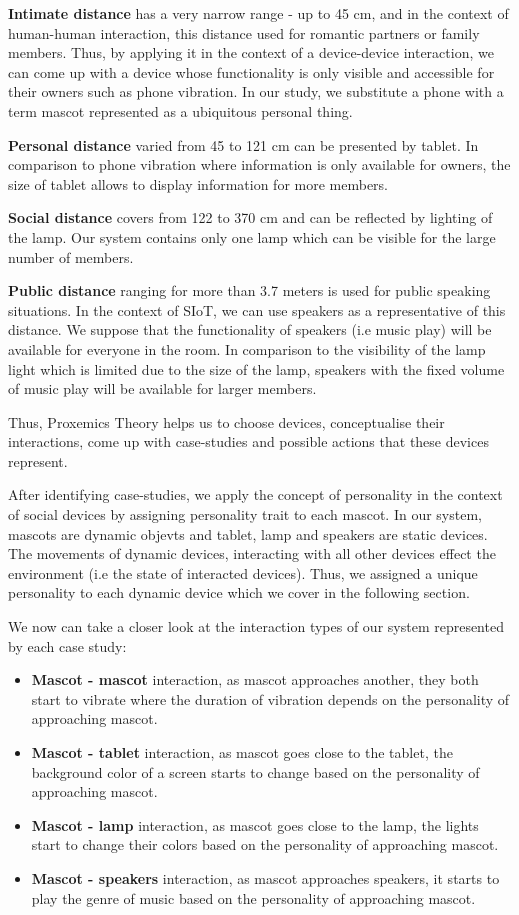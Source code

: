 \textbf{Intimate distance} has a very narrow range - up to 45 cm,
and in the context of human-human interaction, this distance used for romantic partners or family members.
Thus, by applying it in the context of a device-device interaction, we can come up with
a device whose functionality is only visible and accessible for their owners such as phone vibration.
In our study, we substitute a phone with a term mascot represented as a ubiquitous personal thing.

\textbf{Personal distance} varied from 45 to 121 cm can be presented by tablet.
In comparison to phone vibration where information is only available for owners,
the size of tablet allows to display information for more members.

\textbf{Social distance} covers from 122 to 370 cm and can be reflected by lighting of the lamp.
Our system contains only one lamp which can be visible for the large number of members.

\textbf{Public distance} ranging for more than 3.7 meters is used for public speaking situations.
In the context of SIoT, we can use speakers as a representative of this distance.
We suppose that the functionality of speakers (i.e music play) will be available for everyone in the room.
In comparison to the visibility of the lamp light which is limited due to the size of the lamp,
speakers with the fixed volume of music play will be available for larger members.

Thus, Proxemics Theory helps us to choose devices, conceptualise their interactions,
come up with case-studies and possible actions that these devices represent.

After identifying case-studies, we apply the concept of personality in the context of
social devices by assigning personality trait to each mascot.
In our system, mascots are dynamic objevts and tablet, lamp and speakers are static devices.
The movements of dynamic devices, interacting with all other
devices effect the environment (i.e the state of interacted devices).
Thus, we assigned a unique personality to each dynamic device which we cover in the following section.

We now can take a closer look at the interaction types of our system represented by each case study:
\begin{itemize}
  \item \textbf{Mascot - mascot} interaction, as mascot approaches another,
        they both start to vibrate where the duration of vibration depends on the personality of approaching mascot.
  \item \textbf{Mascot - tablet} interaction, as mascot goes close to the tablet, the background
        color of a screen starts to change based on the personality of approaching mascot.
   \item \textbf{Mascot - lamp} interaction, as mascot goes close to the lamp,
        the lights start to change their colors based on the personality of approaching mascot.
   \item \textbf{Mascot - speakers} interaction, as mascot approaches speakers,
        it starts to play the genre of music based on the personality of approaching mascot.
\end{itemize}

